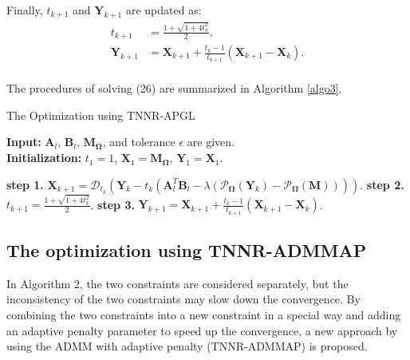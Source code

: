 \documentclass{article}
\begin{document}
{Finally, $t_{k+1}$ and $\mathbf Y_{k+1}$ are updated as:
\begin{equation}
    \begin{aligned}
        t_{k+1} & = \frac{1+\sqrt{1+4t^2_k}}{2}, \\
        \mathbf Y_{k+1}& = \mathbf X_{k+1} +\frac{t_{k}-1}{t_{k+1}}(\mathbf X_{k+1}-\mathbf X_{k}). \\
    \end{aligned}
\end{equation}

The procedures of solving (26) are summarized in Algorithm \ref{algo3}.

\begin{algorithm}[t]
    \caption{The Optimization using TNNR-APGL}
    \label{algo3}
    \textbf{Input:} $\mathbf A_l$, $\mathbf B_l$, $\mathbf M_{\mathbf\Omega}$, and tolerance $\epsilon$ are given.\\
    \textbf{Initialization:} $t_1 = 1$, $\mathbf X_1 = \mathbf M_{\mathbf\Omega}$, $\mathbf Y_1=\mathbf X_1$.
    \begin{algorithmic}
        \Repeat 
        \State \textbf{step 1.} $\mathbf X_{k+1} = \mathcal{D}_{t_k}(\mathbf Y_k - t_k(\mathbf A_l^T\mathbf B_l - \lambda(\mathcal{P}_{\mathbf\Omega}(\mathbf Y_k)- \mathcal{P}_{\mathbf\Omega}(\mathbf M))))$.
        \State \textbf{step 2.} $t_{k+1} = \frac{1+\sqrt{1+4t^2_k}}{2}$.
        \State \textbf{step 3.} $\mathbf Y_{k+1} = \mathbf X_{k+1} +\frac{t_{k}-1}{t_{k+1}}(\mathbf X_{k+1}-\mathbf X_{k})$.
    \end{algorithmic}
\end{algorithm}


\subsection{The optimization using TNNR-ADMMAP}
In Algorithm 2, the two constraints are considered separately, but the inconsistency of the two constraints may slow down the convergence.
By combining the two constraints into a new constraint in a special way and adding an adaptive penalty parameter to speed up the convergence,  a new approach by using the ADMM with adaptive penalty (TNNR-ADMMAP) is proposed.
}
\end{document}
